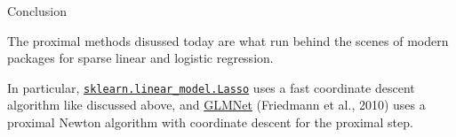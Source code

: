 \documentclass[aspectratio=169]{beamer}
\begin{document}
\begin{frame}[t,allowframebreaks]{Conclusion}\label{conclusion}

The proximal methods disussed today are what run behind the scenes of
modern packages for sparse linear and logistic regression. 

In
particular,
\href{https://scikit-learn.org/stable/modules/generated/sklearn.linear_model.Lasso.html}{\texttt{sklearn.linear\_model.Lasso}}
uses a fast coordinate descent algorithm like discussed above, and
\href{https://glmnet.stanford.edu/articles/glmnet.html}{GLMNet}
(Friedmann et al., 2010) uses a proximal Newton
algorithm with coordinate descent for the proximal step.

\end{frame}

    
    
\end{document}
